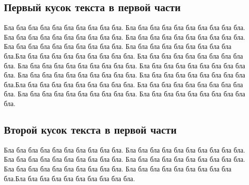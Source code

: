 \documentclass[12pt,a4paper, oneside]{report}
\begin{document}
\subsection{Первый кусок текста в первой части}
Бла бла бла бла бла бла бла бла бла бла. Бла бла бла бла бла бла бла бла бла бла. Бла бла бла бла бла бла бла бла бла бла. Бла бла бла бла бла бла бла бла бла бла. Бла бла бла бла бла бла бла бла бла бла. Бла бла бла бла бла бла бла бла бла бла.Бла бла бла бла бла бла бла бла бла бла. Бла бла бла бла бла бла бла бла бла бла. Бла бла бла бла бла бла бла бла бла бла. Бла бла бла бла бла бла бла бла бла бла. Бла бла бла бла бла бла бла бла бла бла. Бла бла бла бла бла бла бла бла бла бла.Бла бла бла бла бла бла бла бла бла бла. Бла бла бла бла бла бла бла бла бла бла. Бла бла бла бла бла бла бла бла бла бла. Бла бла бла бла бла бла бла бла бла бла.

\subsection{Второй кусок текста в первой части}

Бла бла бла бла бла бла бла бла бла бла. Бла бла бла бла бла бла бла бла бла бла. Бла бла бла бла бла бла бла бла бла бла. Бла бла бла бла бла бла бла бла бла бла. Бла бла бла бла бла бла бла бла бла бла. Бла бла бла бла бла бла бла бла бла бла.Бла бла бла бла бла бла бла бла бла бла.
\end{document}

